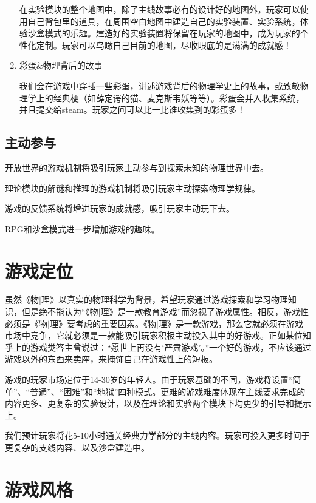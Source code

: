 \documentclass{tstextbook}
\begin{document}
\begin{enumerate}
在实验模块的整个地图中，除了主线故事必有的设计好的地图外，玩家可以使用自己背包里的道具，在周围空白地图中建造自己的实验装置、实验系统，体验沙盒模式的乐趣。建造好的实验装置将保留在玩家的地图中，成为玩家的个性化定制。玩家可以鸟瞰自己目前的地图，尽收眼底的是满满的成就感！

\item{彩蛋$\&$物理背后的故事}

我们会在游戏中穿插一些彩蛋，讲述游戏背后的物理学史上的故事，或致敬物理学上的经典梗（如薛定谔的猫、麦克斯韦妖等等）。彩蛋会并入收集系统，并且提交给steam。玩家之间可以比一比谁收集到的彩蛋多！

\end{enumerate}


\subsection{主动参与}

开放世界的游戏机制将吸引玩家主动参与到探索未知的物理世界中去。

理论模块的解谜和推理的游戏机制将吸引玩家主动探索物理学规律。

游戏的反馈系统将增进玩家的成就感，吸引玩家主动玩下去。

RPG和沙盒模式进一步增加游戏的趣味。

\section{游戏定位}

虽然《物$|$理》以真实的物理科学为背景，希望玩家通过游戏探索和学习物理知识，但是绝不能认为“《物$|$理》是一款教育游戏”而忽视了游戏属性。相反，游戏性必须是《物$|$理》要考虑的重要因素。《物$|$理》是一款游戏，那么它就必须在游戏市场中竞争，它就必须是一款能吸引玩家积极主动投入其中的好游戏。正如某位知乎上的游戏类答主曾说过：“愿世上再没有‘严肃游戏’。”一个好的游戏，不应该通过游戏以外的东西来卖座，来掩饰自己在游戏性上的短板。

游戏的玩家市场定位于14-30岁的年轻人。由于玩家基础的不同，游戏将设置“简单”、“普通”、“困难”和“地狱”四种模式。更难的游戏难度体现在主线要求完成的内容更多、更复杂的实验设计，以及在理论和实验两个模块下均更少的引导和提示上。

我们预计玩家将花5-10小时通关经典力学部分的主线内容。玩家可投入更多时间于更复杂的支线内容、以及沙盒建造中。

\section{游戏风格}
\end{document}
